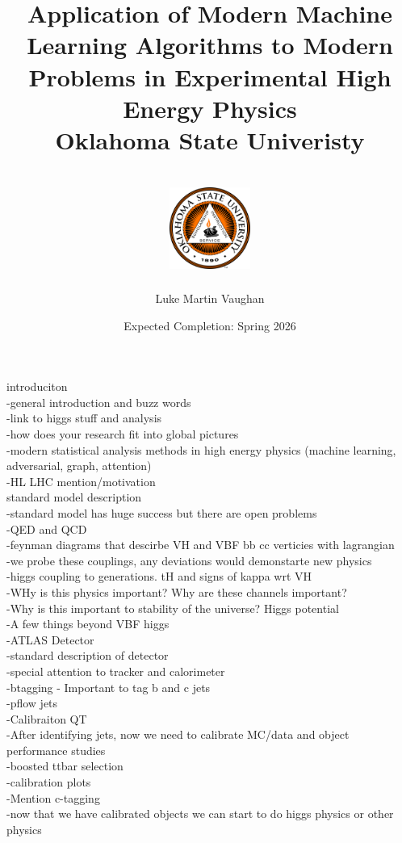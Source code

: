 \documentclass[12pt]{report}
\title{
  {Application of Modern Machine Learning Algorithms to Modern Problems in Experimental High Energy Physics}\\
  {\large Oklahoma State Univeristy}\\
  {\hfill}\\
  {\includegraphics[width=0.2\textwidth]{Oklahoma_State_University_seal.png}}
}
\author{Luke Martin Vaughan}
\date{Expected Completion: Spring 2026}
\begin{document}
\maketitle

introduciton \\
	-general introduction and buzz words \\
	-link to higgs stuff and analysis \\
	-how does your research fit into global pictures \\
	-modern statistical analysis methods in high energy physics (machine learning, adversarial, graph, attention) \\
	-HL LHC mention/motivation \\

standard model description \\
	-standard model has huge success but there are open problems \\
	-QED and QCD \\
	-feynman diagrams that descirbe VH and VBF bb cc verticies with lagrangian \\
	-we probe these couplings, any deviations would demonstarte new physics \\
	-higgs coupling to generations. tH and signs of kappa wrt VH \\
	-WHy is this physics important? Why are these channels important? \\
	-Why is this important to stability of the universe? Higgs potential \\
	-A few things beyond VBF higgs \\

-ATLAS Detector \\
	-standard description of detector \\
	-special attention to tracker and calorimeter \\
	-btagging - Important to tag b and c jets \\
	-pflow jets \\

-Calibraiton QT \\
	-After identifying jets, now we need to calibrate MC/data and object performance studies \\
	-boosted ttbar selection \\
	-calibration plots \\
	-Mention c-tagging \\
	-now that we have calibrated objects we can start to do higgs physics or other physics \\
\end{document}
